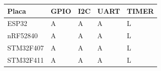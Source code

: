 \begin{tabular}{lllll}
\hline
Placa & GPIO & I2C & UART & TIMER \\
\hline
ESP32 & A & A & A & L \\
nRF52840 & A & A & A & L \\
STM32F407 & A & A & A & L \\
STM32F411 & A & A & A & L \\
\hline
\end{tabular}
